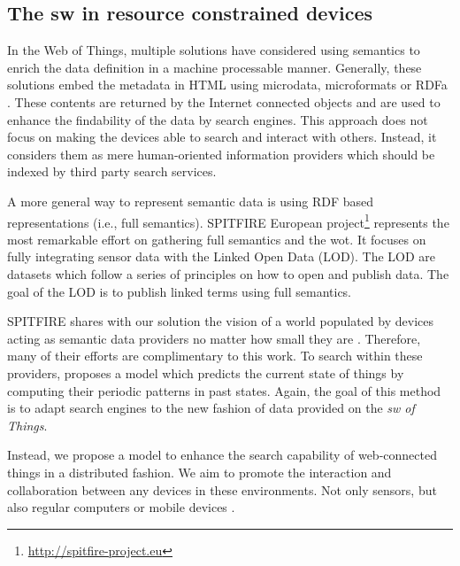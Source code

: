 \subsection{The \acl{sw} in resource constrained devices}



In the Web of Things, multiple solutions have considered using semantics to enrich the data definition in a machine processable manner.
Generally, these solutions embed the metadata in HTML using microdata, microformats or RDFa \citep{mayer_extensible_2011}.
These contents are returned by the Internet connected objects and are used to enhance the findability of the data by search engines.
This approach does not focus on making the devices able to search and interact with others.
Instead, it considers them as mere human-oriented information providers which should be indexed by third party search services.

A more general way to represent semantic data is using RDF based representations (i.e., full semantics).
SPITFIRE European project\footnote{\url{http://spitfire-project.eu}} represents the most remarkable effort on gathering full semantics and the \ac{wot}.
It focuses on fully integrating sensor data with the Linked Open Data (LOD). 
The LOD are datasets which follow a series of principles on how to open and publish data.
The goal of the LOD is to publish linked terms using full semantics.

SPITFIRE shares with our solution the vision of a world populated by devices acting as semantic data providers no matter how small they are \citep{hasemann_rdf_2012}.
Therefore, many of their efforts are complimentary to this work.
To search within these providers, \citet{pfisterer_spitfire:_2011} proposes a model which predicts the current state of things by computing their periodic patterns in past states.
Again, the goal of this method is to adapt search engines to the new fashion of data provided on the \emph{\acl{sw} of Things}.

Instead, we propose a model to enhance the search capability of web-connected things in a distributed fashion.
We aim to promote the interaction and collaboration between any devices in these environments.
Not only sensors, but also regular computers or mobile devices \citep{balandin_access_2011}.